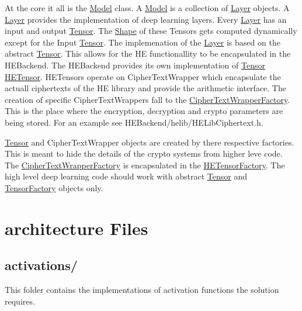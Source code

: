 At the core it all is the {\ttfamily \hyperlink{classModel}{Model}} class. A {\ttfamily \hyperlink{classModel}{Model}} is a collection of {\ttfamily \hyperlink{classLayer}{Layer}} objects. A {\ttfamily \hyperlink{classLayer}{Layer}} provides the implementation of deep learning layers. Every {\ttfamily \hyperlink{classLayer}{Layer}} has an input and output {\ttfamily \hyperlink{classTensor}{Tensor}}. The {\ttfamily \hyperlink{classShape}{Shape}} of these {\ttfamily Tensors} gets computed dynamically except for the Input {\ttfamily \hyperlink{classTensor}{Tensor}}. The implemenation of the {\ttfamily \hyperlink{classLayer}{Layer}} is based on the abstract {\ttfamily \hyperlink{classTensor}{Tensor}}. This allows for the HE functionallity to be encapsulated in the H\+E\+Backend. The H\+E\+Backend provides its own implementation of {\ttfamily \hyperlink{classTensor}{Tensor}} {\ttfamily \hyperlink{classHETensor}{H\+E\+Tensor}}. {\ttfamily H\+E\+Tensors} operate on {\ttfamily Cipher\+Text\+Wrapper} which encapsulate the actuall ciphertexts of the HE library and provide the arithmetic interface. The creation of specific {\ttfamily Cipher\+Text\+Wrappers} fall to the {\ttfamily \hyperlink{classCipherTextWrapperFactory}{Cipher\+Text\+Wrapper\+Factory}}. This is the place where the encryption, decryption and crypto parameters are being stored. For an example see {\ttfamily H\+E\+Backend/helib/\+H\+E\+Lib\+Ciphertext.\+h}.

{\ttfamily \hyperlink{classTensor}{Tensor}} and {\ttfamily Cipher\+Text\+Wrapper} objects are created by there respective factories. This is meant to hide the details of the crypto systems from higher leve code. The {\ttfamily \hyperlink{classCipherTextWrapperFactory}{Cipher\+Text\+Wrapper\+Factory}} is encapsulated in the {\ttfamily \hyperlink{classHETensorFactory}{H\+E\+Tensor\+Factory}}. The high level deep learning code should work with abstract {\ttfamily \hyperlink{classTensor}{Tensor}} and {\ttfamily \hyperlink{classTensorFactory}{Tensor\+Factory}} objects only.

\section*{architecture Files}

\subsection*{activations/}

This folder contains the implementations of activation functions the solution requires.

